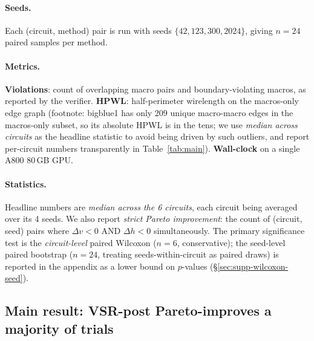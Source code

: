 \documentclass{article}
\begin{document}
\paragraph{Seeds.}  Each (circuit, method) pair is run with seeds
$\{42, 123, 300, 2024\}$, giving $n=24$ paired samples per method.

\paragraph{Metrics.}
\textbf{Violations}: count of overlapping macro pairs and boundary-violating
macros, as reported by the verifier.
\textbf{HPWL}: half-perimeter wirelength on the macros-only edge graph
(footnote: bigblue1 has only 209 unique macro-macro edges in the macros-only
subset, so its absolute HPWL is in the tens; we use \emph{median across
circuits} as the headline statistic to avoid being driven by such outliers,
and report per-circuit numbers transparently in Table~\ref{tab:main}).
\textbf{Wall-clock} on a single A800 80\,GB GPU.

\paragraph{Statistics.}  Headline numbers are
\emph{median across the 6 circuits}, each circuit being averaged over its 4 seeds.
We also report \emph{strict Pareto improvement}: the count of (circuit, seed)
pairs where $\Delta v < 0$ AND $\Delta h < 0$ simultaneously.
The primary significance test is the \emph{circuit-level} paired Wilcoxon
($n=6$, conservative); the seed-level paired bootstrap ($n=24$,
treating seeds-within-circuit as paired draws) is reported in
the appendix as a lower bound on $p$-values
(\S\ref{sec:supp-wilcoxon-seed}).

\subsection{Main result: VSR-post Pareto-improves a majority of trials}
\label{sec:main_result}
\end{document}
